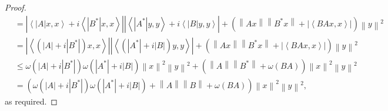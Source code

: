 \documentclass[12pt,twoside,reqno]{amsart}
\numberwithin{equation}{section}
\begin{document}
\begin{proof}
\begin{align}
 & =\left| \left\langle \left| A \right|x,x \right\rangle +i\left\langle \left| {{B}^{*}} \right|x,x \right\rangle  \right|\left| \left\langle \left| {{A}^{*}} \right|y,y \right\rangle +i\left\langle \left| B \right|y,y \right\rangle  \right|+\left( \left\| Ax \right\|\left\| {{B}^{*}}x \right\|+\left| \left\langle BAx,x \right\rangle  \right| \right){{\left\| y \right\|}^{2}} \nonumber\\ 
 & =\left| \left\langle \left( \left| A \right|+i\left| {{B}^{*}} \right| \right)x,x \right\rangle  \right|\left| \left\langle \left( \left| {{A}^{*}} \right|+i\left| B \right| \right)y,y \right\rangle  \right|+\left( \left\| Ax \right\|\left\| {{B}^{*}}x \right\|+\left| \left\langle BAx,x \right\rangle  \right| \right){{\left\| y \right\|}^{2}} \label{3}\\ 
 & \le \omega \left( \left| A \right|+i\left| {{B}^{*}} \right| \right)\omega \left( \left| {{A}^{*}} \right|+i\left| B \right| \right){{\left\| x \right\|}^{2}}{{\left\| y \right\|}^{2}}+\left( \left\| A \right\|\left\| {{B}^{*}} \right\|+\omega \left( BA \right) \right){{\left\| x \right\|}^{2}}{{\left\| y \right\|}^{2}} \nonumber\\ 
 & =\left( \omega \left( \left| A \right|+i\left| {{B}^{*}} \right| \right)\omega \left( \left| {{A}^{*}} \right|+i\left| B \right| \right)+\left\| A \right\|\left\| B \right\|+\omega \left( BA \right) \right){{\left\| x \right\|}^{2}}{{\left\| y \right\|}^{2}}\nonumber,
\end{align}
as required.
\end{proof}
\end{document}
